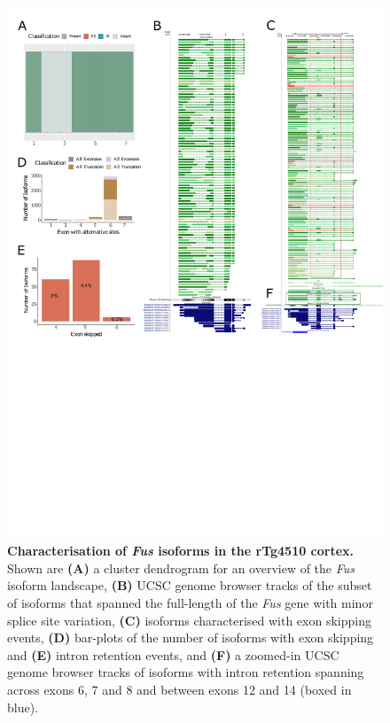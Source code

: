 \begin{figure}[htp]
	\centering
	\includegraphics[page=4,trim={0 4cm 0 0},scale = 0.85]{Figures/TargetGenes_Annotation_Portrait.pdf}
	\captionsetup{width=0.95\textwidth}
	\caption[Characterisation of the \textit{Fus} isoform landscape]%
	{\textbf{Characterisation of \textit{Fus} isoforms in the rTg4510 cortex.} Shown are \textbf{(A)} a cluster dendrogram for an overview of the \textit{Fus} isoform landscape, \textbf{(B)} UCSC genome browser tracks of the subset of isoforms that spanned the full-length of the \textit{Fus} gene with minor splice site variation, \textbf{(C)} isoforms characterised with exon skipping events, \textbf{(D)} bar-plots of the number of isoforms with exon skipping and \textbf{(E)} intron retention events, and \textbf{(F)} a zoomed-in UCSC genome browser tracks of isoforms with intron retention spanning across exons 6, 7 and 8 and between exons 12 and 14 (boxed in blue).}    
	\label{fig:fus}
\end{figure}
\restoregeometry

